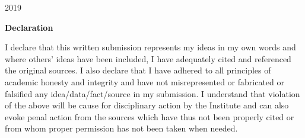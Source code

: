 \documentclass[
11pt, %
english, %
singlespacing, %
headsepline, %
]{MastersDoctoralThesis} %
\begin{document}
\begin{titlepage}
\begin{center}
 
\vfill

{\Large 2019}\\[4cm] %

 
\vfill
\end{center}
\end{titlepage}




% 
\cleardoublepage
{\begin{center}
\huge \textbf{Declaration}\\
\end{center}}
\noindent I declare that this written submission represents my ideas in my own words and where
others' ideas have been included, I have adequately cited and referenced the original
sources. I also declare that I have adhered to all principles of academic honesty and
integrity and have not misrepresented or fabricated or falsified any
idea/data/fact/source in my submission. I understand that violation of the above will
be cause for disciplinary action by the Institute and can also evoke penal action from
the sources which have thus not been properly cited or from whom proper permission
has not been taken when needed.
\vspace{2cm}
\end{document}
